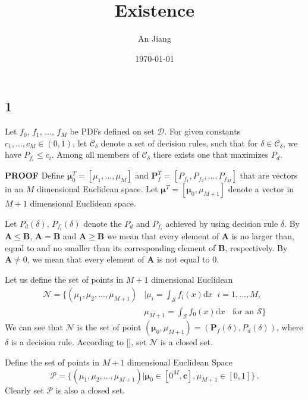 \documentclass[12pt,journal,a4paper,twoside,onecolumn]{IEEEtran}
\title{Existence}
\author{An Jiang}
\date{\today}
\begin{document}
\begin{spacing}{2}
\maketitle
\newcommand{\bmu}{\boldsymbol{\mu}}

\section{1}
Let $f_0$, $f_1$, ..., $f_M$ be PDFs defined on set $\mathcal{D}$. For given constants $c_1, ..., c_M \in (0, 1)$, let $\mathcal{C}_\delta$ denote a set of decision rules,  such that for $\delta \in \mathcal{C}_\delta$, we have $P_{f_i} \leq c_i$.
Among all members of $\mathcal{C}_\delta$ there exists one that maximizes $P_d$.

\textbf{PROOF}
Define $\boldsymbol{\mu}_0^T = [\mu_1, ..., \mu_M]$  and  $\mathbf{P}_f^T = [P_{f_1}, P_{f_2}, ..., P_{f_M}]$ that are vectors in an $M$ dimensional Euclidean  space. Let $\bmu^T = [\bmu_0, \mu_{M+1}]$ denote a vector in $M+1$ dimensional Euclidean space. 

Let $P_d(\delta)$, $P_{f_i}(\delta)$ denote the $P_d$ and $P_{f_i}$ achieved by using decision rule $\delta$.
By $\mathbf{A} \leq \mathbf{B}$, $\mathbf{A} = \mathbf{B}$ and  $\mathbf{A} \geq \mathbf{B}$ we mean that every element of $\mathbf{A}$ is no larger than, equal to and no smaller than its corresponding element of $\mathbf{B}$, respectively. 
By $\mathbf{A} \neq 0$, we mean that every element of $\mathbf{A}$ is not equal to $0$. 

Let us define the set of points in $M+1$ dimensional Euclidean
\begin{equation}
\begin{split}
  \mathcal{N} = \{(\mu_1, \mu_2, ..., \mu_{M+1}) &| \mu_i = \int_{\mathcal{S}}f_i(x)\mathrm{d}x \;\;i=1, ..., M,\\
                                            &  \mu_{M+1}=\int_{\mathcal{S}}f_{0}(x)\mathrm{d}x \;\;\text{ for an $\mathcal{S}$}\}
\end{split}
\end{equation}
We can see that $\mathcal{N}$ is the set of point $(\bmu_0, \mu_{M+1})=(\mathbf{P}_f(\delta), P_d(\delta))$, where $\delta$ is a decision rule. According to [], set $\mathcal{N}$ is a closed set. 

Define the set of points in $M+1$ dimensional Euclidean Space 
\begin{equation}
\mathcal{P} = \{
(\mu_1, \mu_2, ..., \mu_{M+1}) | \bmu_0 \in [0^M, \mathbf{c}], \mu_{M+1} \in [0, 1]
\}\,.
\end{equation}
Clearly set $\mathcal{P}$ is also a closed set.


\end{spacing}
\end{document}
